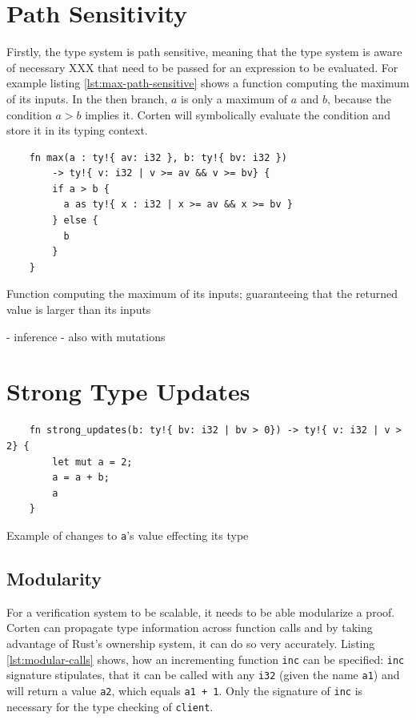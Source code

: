 \documentclass{book}
\newcommand{\code}[1]{\texttt{#1}}
\theoremstyle{definition}
\begin{document}
\label{subsec:path-sensitivify}\section{Path Sensitivity}

Firstly, the type system is path sensitive, meaning that the type system is aware of necessary XXX that need to be passed for an expression to be evaluated. For example listing \ref{lst:max-path-sensitive} shows a function computing the maximum of its inputs. In the then branch, $a$ is only a maximum of $a$ and $b$, because the condition $a > b$ implies it. Corten will symbolically evaluate the condition and store it in its typing context.

\begin{listing}[h]
  \begin{verbatim}
    fn max(a : ty!{ av: i32 }, b: ty!{ bv: i32 })
        -> ty!{ v: i32 | v >= av && v >= bv} {
        if a > b {
          a as ty!{ x : i32 | x >= av && x >= bv }
        } else {
          b
        }
    }
  \end{verbatim}
  \caption{Function computing the maximum of its inputs; guaranteeing that the returned value is larger than its inputs}
  \label{lst:max-path-sensitive}
\end{listing}


- inference
- also with mutations


\label{subsec:strong-type-updates}\section{Strong Type Updates}

\begin{listing}[h]
  \begin{verbatim}
    fn strong_updates(b: ty!{ bv: i32 | bv > 0}) -> ty!{ v: i32 | v > 2} {
        let mut a = 2;
        a = a + b;
        a
    }
  \end{verbatim}
  \caption{Example of changes to \code{a}'s value effecting its type}
  \label{lst:strong-updates}
\end{listing}



\label{subsubsec:modularity}\subsection{Modularity}

For a verification system to be scalable, it needs to be able modularize a proof. Corten can propagate type information across function calls and by taking advantage of Rust's ownership system, it can do so very accurately. Listing \ref{lst:modular-calls} shows, how an incrementing function \code{inc} can be specified: \code{inc} signature stipulates, that it can be called with any \code{i32} (given the name \code{a1}) and will return a value \code{a2}, which equals \code{a1 + 1}. Only the signature of \code{inc} is necessary for the type checking of \code{client}. 
\end{document}
